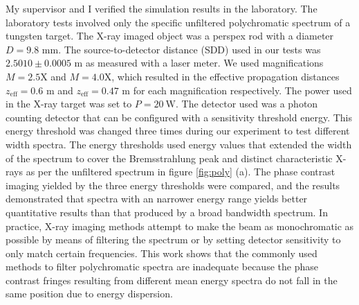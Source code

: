 \documentclass[10pt, a4paper, singlespacing]{report}
\begin{document}
My supervisor and I verified the simulation results in the laboratory. The laboratory tests involved only the specific unfiltered polychromatic spectrum of a tungsten target. The X-ray imaged object was a perspex rod with a diameter $D = 9.8$ mm. The source-to-detector distance (SDD) used in our tests was $2.5010 \pm 0.0005$ m as measured with a laser meter. We used magnifications $M = 2.5$X and $M = 4.0$X, which resulted in the effective propagation distances $z_{\mathrm{eff}} = 0.6$ m and $z_{\mathrm{eff}} = 0.47$ m for each magnification respectively. The power used in the X-ray target was set to $P = 20~\mathrm{W}$. The detector used was a photon counting detector that can be configured with a sensitivity threshold energy. This energy threshold was changed three times during our experiment to test different width spectra. The energy thresholds used energy values that extended the width of the spectrum to cover the Bremsstrahlung peak and distinct characteristic X-rays as per the unfiltered spectrum in figure \ref{fig:poly} (a).
The phase contrast imaging yielded by the three energy thresholds were compared, and the results demonstrated that spectra with an narrower energy range yields better quantitative results than that produced by a broad bandwidth spectrum. 
In practice, X-ray imaging methods attempt to make the beam as monochromatic as possible by means of filtering the spectrum or by setting detector sensitivity to only match certain frequencies. This work shows that the commonly used methods to filter polychromatic spectra are inadequate because the phase contrast fringes resulting from different mean energy spectra do not fall in the same position due to energy dispersion.

\end{document}
